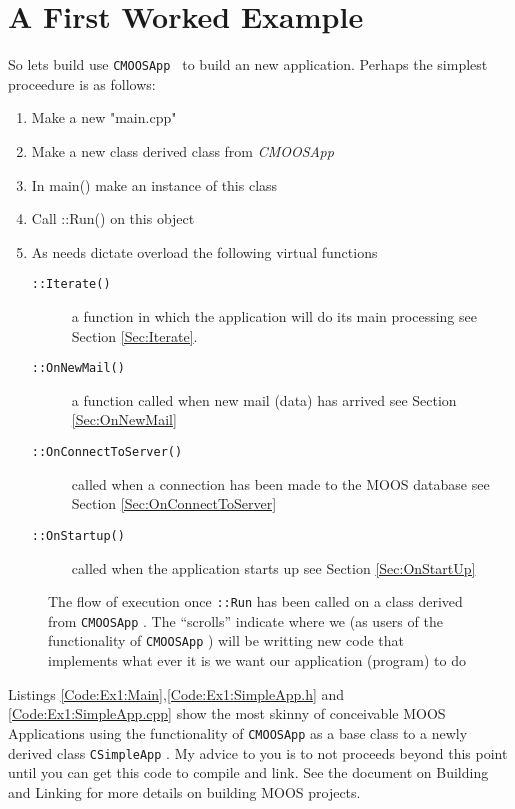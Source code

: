 \documentclass[a4paper,10pt]{article}
\newcommand{\Code}[1]{\texttt{#1} }
\newcommand{\code}[1]{\Code{#1} }
\begin{document}
\section{A First Worked Example}

So lets build use \code{CMOOSApp } to build an new application. Perhaps
the simplest proceedure  is as follows:

\begin{enumerate}
\item Make a new "main.cpp"
\item Make a new class derived  class from \textit{CMOOSApp}
\item In main() make an instance of this class
\item Call ::Run() on this object
\item As needs dictate overload the following virtual functions
    \begin{description}
    \item[\Code{::Iterate()}] a function in which the application will do its main processing see Section \ref{Sec:Iterate}.
    \item[\Code{::OnNewMail()}] a function called when  new mail (data) has arrived see Section \ref{Sec:OnNewMail}
    \item[\Code{::OnConnectToServer()}] called when a connection has been made to the MOOS database see Section \ref{Sec:OnConnectToServer}
    \item[\Code{::OnStartup()}] called when the application starts up see Section \ref{Sec:OnStartUp}
    \end{description}
\end{enumerate}

\begin{figure}[h!]
\centering {} \caption{The flow of execution once
\code{::Run} has been called on a class derived from
\code{CMOOSApp}. The ``scrolls'' indicate where we (as users of
the functionality of \code{CMOOSApp}) will be writting new code
that implements what ever it is we want our application (program)
to do }\label{Fig:MOOSAppRun}
\end{figure}


Listings \ref{Code:Ex1:Main},\ref{Code:Ex1:SimpleApp.h} and
\ref{Code:Ex1:SimpleApp.cpp} show the most skinny of conceivable
MOOS Applications using the functionality of \code{CMOOSApp} as a
base class to a newly derived class \code{CSimpleApp}. My advice
to you is to not proceeds beyond this point until you can get this
code to compile and link. See the document on Building and Linking
 for more details on building MOOS projects.
\end{document}
